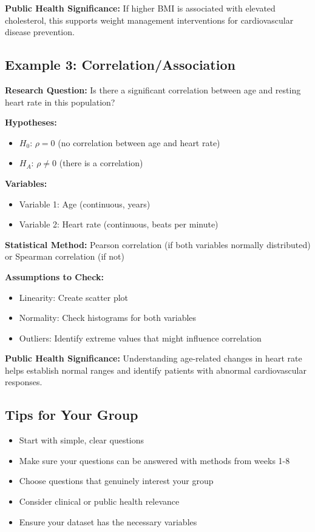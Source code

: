 \documentclass[11pt]{article}
\begin{document}
\textbf{Public Health Significance:}
If higher BMI is associated with elevated cholesterol, this supports weight management interventions for cardiovascular disease prevention.

\subsection*{Example 3: Correlation/Association}

\textbf{Research Question:}
Is there a significant correlation between age and resting heart rate in this population?

\textbf{Hypotheses:}
\begin{itemize}
\item $H_0$: $\rho = 0$ (no correlation between age and heart rate)
\item $H_A$: $\rho \neq 0$ (there is a correlation)
\end{itemize}

\textbf{Variables:}
\begin{itemize}
\item Variable 1: Age (continuous, years)
\item Variable 2: Heart rate (continuous, beats per minute)
\end{itemize}

\textbf{Statistical Method:}
Pearson correlation (if both variables normally distributed) or Spearman correlation (if not)

\textbf{Assumptions to Check:}
\begin{itemize}
\item Linearity: Create scatter plot
\item Normality: Check histograms for both variables
\item Outliers: Identify extreme values that might influence correlation
\end{itemize}

\textbf{Public Health Significance:}
Understanding age-related changes in heart rate helps establish normal ranges and identify patients with abnormal cardiovascular responses.

\subsection*{Tips for Your Group}

\begin{itemize}
\item Start with simple, clear questions
\item Make sure your questions can be answered with methods from weeks 1-8
\item Choose questions that genuinely interest your group
\item Consider clinical or public health relevance
\item Ensure your dataset has the necessary variables
\end{itemize}
\end{document}
